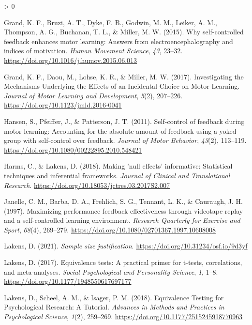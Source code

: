 \documentclass[
  english,
  jou]{apa7}
\newlength{\cslhangindent}
\newenvironment{CSLReferences}[2] %
 {%
  \setlength{\parindent}{0pt}
  \ifodd #1 \everypar{\setlength{\hangindent}{\cslhangindent}}\ignorespaces\fi
  \ifnum #2 > 0
  \setlength{\parskip}{#2\baselineskip}
  \fi
 }%
 {}
\begin{document}
\begin{CSLReferences}{1}{0}
\leavevmode\hypertarget{ref-grand2015}{}%
Grand, K. F., Bruzi, A. T., Dyke, F. B., Godwin, M. M., Leiker, A. M., Thompson, A. G., Buchanan, T. L., \& Miller, M. W. (2015). Why self-controlled feedback enhances motor learning: Answers from electroencephalography and indices of motivation. \emph{Human Movement Science}, \emph{43}, 23--32. \url{https://doi.org/10.1016/j.humov.2015.06.013}

\leavevmode\hypertarget{ref-grand2017}{}%
Grand, K. F., Daou, M., Lohse, K. R., \& Miller, M. W. (2017). Investigating the Mechanisms Underlying the Effects of an Incidental Choice on Motor Learning. \emph{Journal of Motor Learning and Development}, \emph{5}(2), 207--226. \url{https://doi.org/10.1123/jmld.2016-0041}

\leavevmode\hypertarget{ref-hansen2011}{}%
Hansen, S., Pfeiffer, J., \& Patterson, J. T. (2011). Self-control of feedback during motor learning: Accounting for the absolute amount of feedback using a yoked group with self-control over feedback. \emph{Journal of Motor Behavior}, \emph{43}(2), 113--119. \url{https://doi.org/10.1080/00222895.2010.548421}

\leavevmode\hypertarget{ref-harms2018}{}%
Harms, C., \& Lakens, D. (2018). Making 'null effects' informative: Statistical techniques and inferential frameworks. \emph{Journal of Clinical and Translational Research}. \url{https://doi.org/10.18053/jctres.03.2017S2.007}

\leavevmode\hypertarget{ref-janelle1997}{}%
Janelle, C. M., Barba, D. A., Frehlich, S. G., Tennant, L. K., \& Cauraugh, J. H. (1997). Maximizing performance feedback effectiveness through videotape replay and a self-controlled learning environment. \emph{Research Quarterly for Exercise and Sport}, \emph{68}(4), 269--279. \url{https://doi.org/10.1080/02701367.1997.10608008}

\leavevmode\hypertarget{ref-lakens2021}{}%
Lakens, D. (2021). \emph{Sample size justification}. \url{https://doi.org/10.31234/osf.io/9d3yf}

\leavevmode\hypertarget{ref-R-TOSTER}{}%
Lakens, D. (2017). Equivalence tests: A practical primer for t-tests, correlations, and meta-analyses. \emph{Social Psychological and Personality Science}, \emph{1}, 1--8. \url{https://doi.org/10.1177/1948550617697177}

\leavevmode\hypertarget{ref-lakens2018}{}%
Lakens, D., Scheel, A. M., \& Isager, P. M. (2018). Equivalence Testing for Psychological Research: A Tutorial. \emph{Advances in Methods and Practices in Psychological Science}, \emph{1}(2), 259--269. \url{https://doi.org/10.1177/2515245918770963}


\end{CSLReferences}
\end{document}

